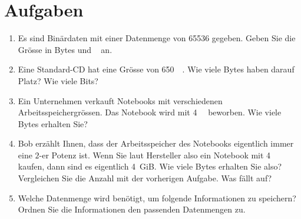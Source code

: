 \section{Aufgaben}
\begin{enumerate}
\item Es sind Binärdaten mit einer Datenmenge von \qty{65536}{\bit} gegeben. Geben Sie die Grösse in Bytes und \unit{\kibi\byte} an.
\fillwithgrid{1in}
\item Eine Standard-CD hat eine Grösse von  \qty{650}{\mega\byte}. Wie viele Bytes haben darauf Platz? Wie viele Bits?
\fillwithgrid{1in}
\item Ein Unternehmen verkauft Notebooks mit verschiedenen Arbeitsspeichergrössen. Das Notebook wird mit  \qty{4}{\giga\byte} beworben. Wie viele Bytes erhalten Sie?
\fillwithgrid{1.25in}
\item Bob erzählt Ihnen, dass der Arbeitsspeicher des Notebooks eigentlich immer eine $2$-er Potenz ist. Wenn Sie laut Hersteller also ein Notebook mit \qty{4}{\giga\byte} kaufen, dann sind es eigentlich \qty{4}{GiB}. Wie viele Bytes erhalten Sie also? Vergleichen Sie die Anzahl mit der vorherigen Aufgabe. Was fällt auf?
\fillwithgrid{1.5in}
\item Welche Datenmenge wird benötigt, um folgende Informationen zu speichern? Ordnen Sie die Informationen den passenden Datenmengen zu.
\begin{multicols}{3}
\end{multicols}
\end{enumerate}
